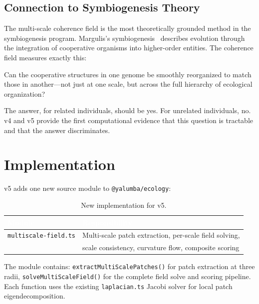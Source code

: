 \documentclass{../yalumba}
\begin{document}
\subsection{Connection to Symbiogenesis Theory}

The multi-scale coherence field is the most theoretically grounded method
in the symbiogenesis program.  Margulis's symbiogenesis~\cite{margulis1998}
describes evolution through the integration of cooperative organisms into
higher-order entities.  The coherence field measures exactly this:

\begin{pullquote}
Can the cooperative structures in one genome be smoothly reorganized to
match those in another---not just at one scale, but across the full
hierarchy of ecological organization?
\end{pullquote}

The answer, for related individuals, should be yes.  For unrelated
individuals, no.  v4 and v5 provide the first computational evidence that
this question is tractable and that the answer discriminates.


\section{Implementation}
\label{sec:implementation}

v5 adds one new source module to \texttt{@yalumba/ecology}:

\begin{table}[H]
  \centering
  \tablestyle
  \caption{New implementation for v5.}
  \label{tab:implementation}
  \begin{tabular}{ll}
    \toprule
    \rowcolor{table-header}
    \textcolor{white}{\textbf{Module}} &
    \textcolor{white}{\textbf{Responsibility}} \\
    \midrule
    \texttt{multiscale-field.ts} &
      Multi-scale patch extraction, per-scale field solving, \\
    & scale consistency, curvature flow, composite scoring \\
    \bottomrule
  \end{tabular}
\end{table}

The module contains: \texttt{extractMultiScalePatches()} for patch extraction
at three radii, \texttt{solveMultiScaleField()} for the complete field solve
and scoring pipeline.  Each function uses the existing \texttt{laplacian.ts}
Jacobi solver for local patch eigendecomposition.
\end{document}
